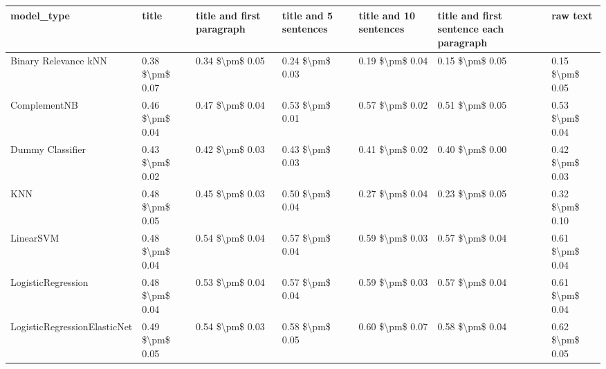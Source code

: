\begin{tabular}{lllllll}
\toprule
                     model\_type &           title & title and first paragraph & title and 5 sentences & title and 10 sentences & title and first sentence each paragraph &            raw text \\
\midrule
           Binary Relevance kNN & 0.38 \$\textbackslash pm\$ 0.07 &           0.34 \$\textbackslash pm\$ 0.05 &       0.24 \$\textbackslash pm\$ 0.03 &        0.19 \$\textbackslash pm\$ 0.04 &                         0.15 \$\textbackslash pm\$ 0.05 &     0.15 \$\textbackslash pm\$ 0.05 \\
                   ComplementNB & 0.46 \$\textbackslash pm\$ 0.04 &           0.47 \$\textbackslash pm\$ 0.04 &       0.53 \$\textbackslash pm\$ 0.01 &        0.57 \$\textbackslash pm\$ 0.02 &                         0.51 \$\textbackslash pm\$ 0.05 &     0.53 \$\textbackslash pm\$ 0.04 \\
               Dummy Classifier & 0.43 \$\textbackslash pm\$ 0.02 &           0.42 \$\textbackslash pm\$ 0.03 &       0.43 \$\textbackslash pm\$ 0.03 &        0.41 \$\textbackslash pm\$ 0.02 &                         0.40 \$\textbackslash pm\$ 0.00 &     0.42 \$\textbackslash pm\$ 0.03 \\
                            KNN & 0.48 \$\textbackslash pm\$ 0.05 &           0.45 \$\textbackslash pm\$ 0.03 &       0.50 \$\textbackslash pm\$ 0.04 &        0.27 \$\textbackslash pm\$ 0.04 &                         0.23 \$\textbackslash pm\$ 0.05 &     0.32 \$\textbackslash pm\$ 0.10 \\
                      LinearSVM & 0.48 \$\textbackslash pm\$ 0.04 &           0.54 \$\textbackslash pm\$ 0.04 &       0.57 \$\textbackslash pm\$ 0.04 &        0.59 \$\textbackslash pm\$ 0.03 &                         0.57 \$\textbackslash pm\$ 0.04 &     0.61 \$\textbackslash pm\$ 0.04 \\
             LogisticRegression & 0.48 \$\textbackslash pm\$ 0.04 &           0.53 \$\textbackslash pm\$ 0.04 &       0.57 \$\textbackslash pm\$ 0.04 &        0.59 \$\textbackslash pm\$ 0.03 &                         0.57 \$\textbackslash pm\$ 0.04 &     0.61 \$\textbackslash pm\$ 0.04 \\
   LogisticRegressionElasticNet & 0.49 \$\textbackslash pm\$ 0.05 &           0.54 \$\textbackslash pm\$ 0.03 &       0.58 \$\textbackslash pm\$ 0.05 &        0.60 \$\textbackslash pm\$ 0.07 &                         0.58 \$\textbackslash pm\$ 0.04 &     0.62 \$\textbackslash pm\$ 0.05 \\

\end{tabular}
